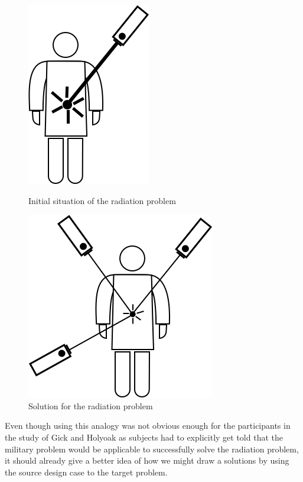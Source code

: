 \documentclass[12pt]{article}
\begin{document}
\begin{figure}[H]
    \centering
    \begin{minipage}[b]{0.45\textwidth}
    	\includegraphics[scale=0.3]{images/laser_1.png}
    	\centering
    	\caption{Initial situation of the radiation problem}
    	\label{fig:radiation_problem}
    \end{minipage}
    \hfill
    \begin{minipage}[b]{0.45\textwidth}
    	\includegraphics[scale=0.3]{images/laser_2.png}
    	\centering
    	\caption{Solution for the radiation problem}
    	\label{fig:radiation_solution}
    \end{minipage}
\end{figure}
\newpage
Even though using this analogy was not obvious enough for the participants in the study of Gick and Holyoak as subjects had to explicitly get told that the military problem would be applicable to successfully solve the radiation problem, it should already give a better idea of how we might draw a solutions by using the source design case to the target problem. \\
\end{document}
